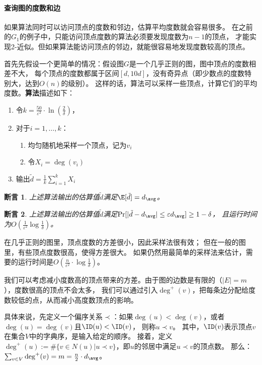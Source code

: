 \documentclass[lang=cn,newtx,10pt,scheme=chinese,chinesefont=nofont,citestyle=gb7714-2015, bibstyle=gb7714-2015]{elegantbook}
\newtheorem{claim}{断言}[chapter]   %
\begin{document}
\begin{refsection}
\paragraph{查询图的度数和边}
如果算法同时可以访问顶点的度数和邻边，估算平均度数就会容易很多。
在之前的$G_1$的例子中，只能访问顶点度数的算法必须要发现度数为$n-1$的顶点，
才能实现2-近似。但如果算法能访问顶点的邻边，就能很容易地发现度数较高的顶点。

首先先假设一个更简单的情况：假设图$G$是一个几乎正则的图，图中顶点的度数相差不大，
每个顶点的度数都属于区间$[d,10d]$，没有奇异点（即少数点的度数特别大，达到$O(n)$的级别）。
这样的话，算法可以采样一些顶点，计算它们的平均度数。\textbf{算法}描述如下：

\begin{enumerate}
    \item 令$k=\frac{50}{\varepsilon^2}\cdot\ln(\frac{2}{\delta})$，
    \item 对于$i=1,\dots,k$：
    \begin{enumerate}
        \item[2.1] 均匀随机地采样一个顶点，记为$v_i$
        \item[2.2] 令$X_i=\deg(v_i)$
    \end{enumerate}
    \item 输出$\tilde{d}=\frac{1}{k}\sum_{i=1}^kX_i$
\end{enumerate}

\begin{claim}
    上述算法输出的估算值$\tilde{d}$满足$\E[\tilde{d}]=d_\avg$。
\end{claim}

\begin{claim}
    上述算法输出的估算值$\tilde{d}$满足$\Pr[|\tilde{d}-d_\avg|\le\varepsilon d_\avg]\ge1-\delta$，
    且运行时间为$O(\frac{1}{\varepsilon^2}\log\frac{1}{\delta})$。
\end{claim}

在几乎正则的图里，顶点度数的方差很小，因此采样法很有效；
但在一般的图里，有些顶点度数很高，使得方差很大。
如果仍然用最简单的采样法来估计，需要的运行时间是$O(\frac{n}{\varepsilon^2}\cdot\log\frac{1}{\delta})$。

\idea 我们可以考虑减小度数高的顶点带来的方差。由于图的边数是有限的（$|E|=m$），度数很高的顶点不会太多，
我们可以通过引入$\deg^+(v)$，把每条边分配给度数较低的点，从而减小高度数顶点的影响。

具体来说，先定义一个偏序关系$\prec$：如果$\deg(u)<\deg(v)$，或者$\deg(u)=\deg(v)$且$\ID(u)<\ID(v)$，
则称$u\prec v$。
其中，$\ID(v)$表示顶点$v$在集合$V$中的字典序，是输入给定的顺序。
接着，定义$\deg^+(u):=\#\{v\in N(u)|u\prec v\}$，即$u$的邻居中满足$u\prec v$的顶点数。
那么：$\sum_{v\in V}\deg^+(v)=m=\frac{n}{2}\cdot d_\avg$。


\end{refsection}
\end{document}
